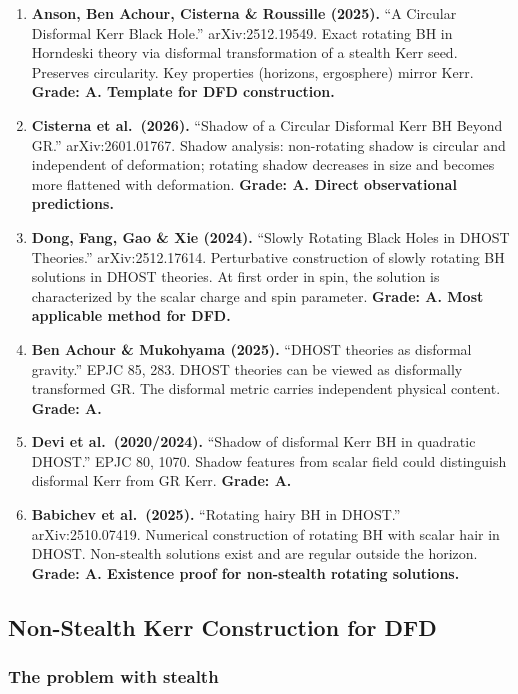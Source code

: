 \documentclass[11pt,a4paper]{article}
\begin{document}
\begin{enumerate}
\item \textbf{Anson, Ben Achour, Cisterna \& Roussille (2025).} ``A Circular Disformal Kerr Black Hole.'' arXiv:2512.19549. Exact rotating BH in Horndeski theory via disformal transformation of a stealth Kerr seed. Preserves circularity. Key properties (horizons, ergosphere) mirror Kerr. \textbf{Grade: A. Template for DFD construction.}

\item \textbf{Cisterna et al.\ (2026).} ``Shadow of a Circular Disformal Kerr BH Beyond GR.'' arXiv:2601.01767. Shadow analysis: non-rotating shadow is circular and independent of deformation; rotating shadow decreases in size and becomes more flattened with deformation. \textbf{Grade: A. Direct observational predictions.}

\item \textbf{Dong, Fang, Gao \& Xie (2024).} ``Slowly Rotating Black Holes in DHOST Theories.'' arXiv:2512.17614. Perturbative construction of slowly rotating BH solutions in DHOST theories. At first order in spin, the solution is characterized by the scalar charge and spin parameter. \textbf{Grade: A. Most applicable method for DFD.}

\item \textbf{Ben Achour \& Mukohyama (2025).} ``DHOST theories as disformal gravity.'' EPJC 85, 283. DHOST theories can be viewed as disformally transformed GR. The disformal metric carries independent physical content. \textbf{Grade: A.}

\item \textbf{Devi et al.\ (2020/2024).} ``Shadow of disformal Kerr BH in quadratic DHOST.'' EPJC 80, 1070. Shadow features from scalar field could distinguish disformal Kerr from GR Kerr. \textbf{Grade: A.}

\item \textbf{Babichev et al.\ (2025).} ``Rotating hairy BH in DHOST.'' arXiv:2510.07419. Numerical construction of rotating BH with scalar hair in DHOST. Non-stealth solutions exist and are regular outside the horizon. \textbf{Grade: A. Existence proof for non-stealth rotating solutions.}
\end{enumerate}

\subsection{Non-Stealth Kerr Construction for DFD}

\subsubsection{The problem with stealth}
\end{document}
